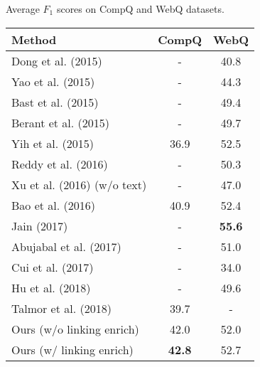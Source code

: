\begin{table}[ht]
    \centering
              {Average $F_1$ scores on CompQ and WebQ datasets.}
    \begin{tabular} {l|c|c}
        \hline
        Method  &   CompQ  & WebQ \\
        \hline
        Dong et al. (2015)    \parencite{dong2015question}            &   -   & 40.8  \\
        Yao et al. (2015)     \parencite{yao2015lean}                 &   -   & 44.3  \\
        Bast et al. (2015)    \parencite{bast2015more}                &   -   & 49.4  \\
        Berant et al. (2015)  \parencite{berant2015imitation}         &   -   & 49.7  \\
        Yih et al. (2015)     \parencite{yih2015semantic}             & 36.9  & 52.5  \\
        Reddy et al. (2016)   \parencite{reddy2016transforming}       &   -   & 50.3  \\
        Xu et al. (2016)      \parencite{xu2016question} (w/o text)   &   -   & 47.0  \\
        Bao et al. (2016)     \parencite{bao2016constraint}           & 40.9  & 52.4  \\
        Jain (2017)           \parencite{jain2016question}            &   -   & \textbf{55.6}  \\
        Abujabal et al. (2017)\parencite{abujabal2017automated}       &   -   & 51.0  \\
        Cui et al. (2017)     \parencite{cui2017kbqa}                 &   -   & 34.0  \\     
        Hu et al. (2018)      \parencite{hu2018answering}             &   -   & 49.6  \\
        Talmor et al. (2018)  \parencite{talmor2018web}               & 39.7  &   -   \\
        \hline
        Ours (w/o linking enrich)       & 42.0  & 52.0  \\
        Ours (w/ linking enrich)        & \textbf{42.8}  & 52.7  \\
        \hline
    \end{tabular}
    \label{tab:compqa-e2e}
\end{table}


